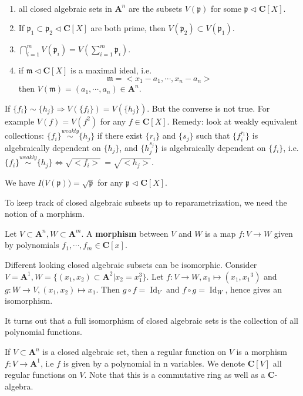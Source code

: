 \documentclass[
11pt, %
letterpaper， %
oneside, %
headinclude,footinclude, %
BCOR5mm, %
]{scrartcl}
\newcommand{\C}{{\mathbf{C}}}
\newcommand{\A}{{\mathbf{A}}}
\newcommand{\p}{{\mathfrak{p}}}
\newcommand{\m}{{\mathfrak{m}}}
\newcommand{\id}{\operatorname{Id}}
\begin{document}
\begin{pr} 
\	
	
\begin{enumerate}
	\item all closed algebraic sets in $\A^n$ are the subsets $V(\p)$ for some $\p \lhd \C[X]$.
	\item If $\p_1\subset  \p_2 \lhd \C[X]$ are both prime, then $V(\p_2)\subset V(\p_1)$. 
	\item $\bigcap_{i=1}^m V(\p_i)=V(\sum_{i=1}^m \p_i).$
	\item if $\m \lhd \C [X]$ is a maximal ideal, i.e. 
	\begin{equation*}
	\m =< x_1-a_1, \cdots, x_n-a_n>
	\end{equation*}
	then $V(\m)=(a_1,\cdots, a_n)\in \A^n$.
\end{enumerate}
\end{pr}

\begin{rem}
	If $\{f_i\}\sim \{ h_j \} \Rightarrow V(\{f_i \})=V(\{h_j\} )$. But the converse is not true. For example $V(f)=V(f^2)$ for any $f\in \C[X]$. Remedy: look at weakly equivalent collections: $\{f_i\}\stackrel{weakly}{\sim}\{h_j\}$ if there exist $\{r_i\}$ and $\{s_j\}$ such that $\{ f_i^{r_i} \}$ is algebraically dependent on $\{h_j \}$, and $\{h_j^{s_j}\}$ is algebraically dependent on $\{f_i\}$, i.e. $\{f_i\}\stackrel{weakly}{\sim}\{h_j\} \Leftrightarrow \sqrt{<f_i>}=\sqrt{<h_j>}$.
\end{rem}

\begin{thm}
	We have $	I\big(V(\p) \big)=\sqrt{\p}$ for any $\p \lhd \C[X]$. 
\end{thm}
To keep track of closed algebraic subsets up to reparametrization, we need the notion of a morphism.

\begin{definition}
	Let $V\subset \A^n, W\subset \A^m$. A {\bfseries morphism } between $V$ and $W$ is a map $f:V\to W$ given by polynomials $f_1, \cdots, f_m \in \C[x]$. 
\end{definition}

\begin{rem}
	Different looking closed algebraic subsets can be isomorphic. Consider $V=\A^1, W=\{(x_1,x_2)\subset \A^2| x_2=x_1^3 \}$. Let $f:V\to W, x_1 \mapsto (x_1,{x_1}^3)$ and $g: W\to V, (x_1,x_2)\mapsto x_1$. Then $g\circ f= \id_V$ and $f \circ g= \id_W$, hence gives an isomorphism. 
\end{rem}
It turns out that a full isomorphism of closed algebraic sets is the collection of all polynomial functions.
\begin{definition}
	If $V \subset \A^n$ is a closed algebraic set, then a regular function on $V$ is a morphism $f:V\to \A^1$, i.e $f$ is given by a polynomial in n variables. We denote $\C[V]$ all regular functions on $V$. Note that this is a commutative ring as well as a $\C$-algebra.
\end{definition}
\end{document}
